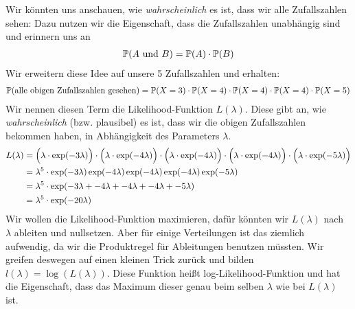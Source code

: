 \documentclass{article}
\begin{document}
	Wir könnten uns anschauen, wie \textit{wahrscheinlich} es ist, dass wir alle Zufallszahlen sehen: Dazu nutzen wir die Eigenschaft, dass die Zufallszahlen unabhängig sind und erinnern uns an
	\begin{align}
		\mathbb{P}(A\text{ und } B) = \mathbb{P}(A)\cdot \mathbb{P}(B) \notag
	\end{align}
	Wir erweitern diese Idee auf unsere 5 Zufallszahlen und erhalten:
	\begin{align}
		\mathbb{P}(\text{alle obigen Zufallszahlen gesehen}) = \mathbb{P}(X=3) \cdot \mathbb{P}(X=4)\cdot\mathbb{P}(X=4)\cdot\mathbb{P}(X=4)\cdot\mathbb{P}(X=5) \notag
	\end{align}
	Wir nennen diesen Term die Likelihood-Funktion $L(\lambda)$. Diese gibt an, wie \textit{wahrscheinlich} (bzw. plausibel) es ist, dass wir die obigen Zufallszahlen bekommen haben, in Abhängigkeit des Parameters $\lambda$.
	\begin{align}
		L(\lambda) &= \Big(\lambda\cdot\exp(-3\lambda)\Big)\cdot \Big(\lambda\cdot\exp(-4\lambda)\Big)\cdot \Big(\lambda\cdot\exp(-4\lambda)\Big)\cdot \Big(\lambda\cdot\exp(-4\lambda)\Big)\cdot \Big(\lambda\cdot\exp(-5\lambda)\Big) \notag \\
		&= \lambda^5 \cdot \exp(-3\lambda)\exp(-4\lambda)\exp(-4\lambda)\exp(-4\lambda)\exp(-5\lambda) \notag \\
		&= \lambda^5\cdot\exp(-3\lambda + -4\lambda + -4\lambda + -4\lambda + -5\lambda) \notag \\
		&= \lambda^5\cdot\exp(-20\lambda) \notag
	\end{align}
	Wir wollen die Likelihood-Funktion maximieren, dafür könnten wir $L(\lambda)$ nach $\lambda$ ableiten und nullsetzen. Aber für einige Verteilungen ist das ziemlich aufwendig, da wir die Produktregel für Ableitungen benutzen müssten. Wir greifen deswegen auf einen kleinen Trick zurück und bilden $l(\lambda) = \log(L(\lambda))$. Diese Funktion heißt log-Likelihood-Funktion und hat die Eigenschaft, dass das Maximum dieser genau beim selben $\lambda$ wie bei $L(\lambda)$ ist.
\end{document}
